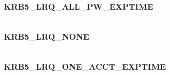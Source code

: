 \documentclass[letterpaper,10pt,english]{sphinxmanual}
\begin{document}
\subsubsection{KRB5\_LRQ\_ALL\_PW\_EXPTIME}
\label{appdev/refs/macros/KRB5_LRQ_ALL_PW_EXPTIME:krb5-lrq-all-pw-exptime-data}\label{appdev/refs/macros/KRB5_LRQ_ALL_PW_EXPTIME::doc}\label{appdev/refs/macros/KRB5_LRQ_ALL_PW_EXPTIME:krb5-lrq-all-pw-exptime}

\begin{fulllineitems}
\label{appdev/refs/macros/KRB5_LRQ_ALL_PW_EXPTIME:KRB5_LRQ_ALL_PW_EXPTIME}
\end{fulllineitems}


\begin{tabulary}{\linewidth}{|L|L|}
\hline

 & 
\\
\hline\end{tabulary}



\subsubsection{KRB5\_LRQ\_NONE}
\label{appdev/refs/macros/KRB5_LRQ_NONE:krb5-lrq-none-data}\label{appdev/refs/macros/KRB5_LRQ_NONE::doc}\label{appdev/refs/macros/KRB5_LRQ_NONE:krb5-lrq-none}

\begin{fulllineitems}
\label{appdev/refs/macros/KRB5_LRQ_NONE:KRB5_LRQ_NONE}
\end{fulllineitems}


\begin{tabulary}{\linewidth}{|L|L|}
\hline

 & 
\\
\hline\end{tabulary}



\subsubsection{KRB5\_LRQ\_ONE\_ACCT\_EXPTIME}
\label{appdev/refs/macros/KRB5_LRQ_ONE_ACCT_EXPTIME::doc}\label{appdev/refs/macros/KRB5_LRQ_ONE_ACCT_EXPTIME:krb5-lrq-one-acct-exptime}\label{appdev/refs/macros/KRB5_LRQ_ONE_ACCT_EXPTIME:krb5-lrq-one-acct-exptime-data}
\end{document}
